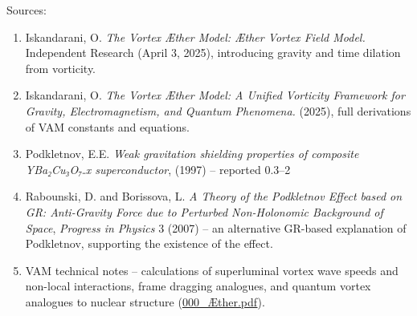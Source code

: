 Sources:


\begin{enumerate}

\item 
Iskandarani, O. \textit{The Vortex Æther Model: Æther Vortex Field Model.} Independent Research (April 3, 2025), introducing gravity and time dilation from vorticity.




\item 
Iskandarani, O. \textit{The Vortex Æther Model: A Unified Vorticity Framework for Gravity, Electromagnetism, and Quantum Phenomena.} (2025), full derivations of VAM constants and equations.




\item 
Podkletnov, E.E. \textit{Weak gravitation shielding properties of composite YBa₂Cu₃O₇₋x superconductor}, (1997) – reported 0.3–2%




\item 
Rabounski, D. and Borissova, L. \textit{A Theory of the Podkletnov Effect based on GR: Anti-Gravity Force due to Perturbed Non-Holonomic Background of Space}, \textit{Progress in Physics} 3 (2007) – an alternative GR-based explanation of Podkletnov, supporting the existence of the effect.




\item 
VAM technical notes – calculations of superluminal vortex wave speeds and non-local interactions, frame dragging analogues, and quantum vortex analogues to nuclear structure (\href{file://file-f6wuuwzjgr23npodmed4pi%23:~:text=in%20a%20dynamic%20picture,%20absorption,electron%20changing%20orbitals/}{000_Æther.pdf}).




\end{enumerate}
